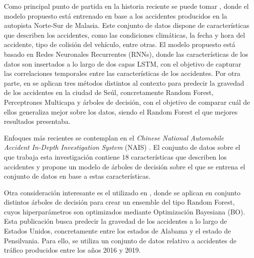 \documentclass{uathesis-es}
\begin{document}
Como principal punto de partida en la historia reciente se puede tomar \cite{app7060476}, donde el modelo propuesto está entrenado en base a los accidentes producidos en la autopista Norte-Sur de Malasia. Este conjunto de datos dispone de características que describen los accidentes, como las condiciones climáticas, la fecha y hora del accidente, tipo de colisión del vehículo, entre otras. El modelo propuesto está basado en Redes Neuronales Recurrentes (RNNs), donde las características de los datos son insertados a lo largo de dos capas LSTM, con el objetivo de capturar las correlaciones temporales entre las características de los accidentes. Por otra parte, en \cite{app10010129} se aplican tres métodos distintos al contexto para predecir la gravedad de los accidentes en la ciudad de Seúl, concretamente Random Forest, Perceptrones Multicapa y árboles de decisión, con el objetivo de comparar cuál de ellos generaliza mejor sobre los datos, siendo el Random Forest el que mejores resultados presentaba.

Enfoques más recientes se contemplan en el \textit{Chinese National Automobile Accident In-Depth Investigation System} (NAIS) \cite{Yang2023}. El conjunto de datos sobre el que trabaja esta investigación contiene $18$ características que describen los accidentes y propone un modelo de árboles de decisión sobre el que se entrena el conjunto de datos en base a estas características.

Otra consideración interesante es el utilizado en \cite{su14031729}, donde se aplican en conjunto distintos árboles de decisión para crear un ensemble del tipo Random Forest, cuyos hiperparámetros son optimizados mediante Optimización Bayesiana (BO). Esta publicación busca predecir la gravedad de los accidentes a lo largo de Estados Unidos, concretamente entre los estados de Alabama y el estado de Pensilvania. Para ello, se utiliza un conjunto de datos relativo a accidentes de tráfico producidos entre los años 2016 y 2019.
\end{document}

